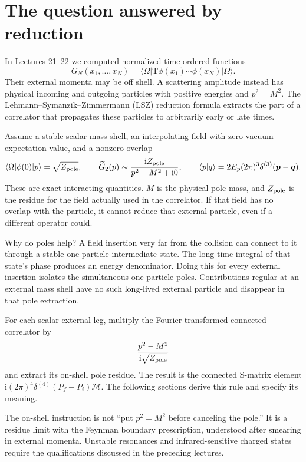 \documentclass[11pt]{article}
\newcommand{\ii}{\mathrm i}
\newcommand{\Tord}{\mathrm T}
\newcommand{\ket}[1]{\lvert#1\rangle}
\newcommand{\bra}[1]{\langle#1\rvert}
\newcommand{\cM}{\mathcal M}
\newcommand{\Zp}{Z_{\rm pole}}
\begin{document}
\section{The question answered by reduction}
In Lectures 21--22 we computed normalized time-ordered functions
\begin{equation}
 G_N(x_1,\ldots,x_N)
 =\bra{\Omega}\Tord\phi(x_1)\cdots\phi(x_N)\ket{\Omega}.
\end{equation}
Their external momenta may be off shell. A scattering amplitude instead
has physical incoming and outgoing particles with positive energies and
\(p^2=M^2\). The Lehmann--Symanzik--Zimmermann (LSZ) reduction formula
extracts the part of a correlator that propagates these particles to
arbitrarily early or late times.

Assume a stable scalar mass shell, an interpolating field with zero vacuum
expectation value, and a nonzero overlap
\begin{equation}
 \bra{\Omega}\phi(0)\ket{p}=\sqrt{\Zp},\qquad
 \widetilde G_2(p)\sim\frac{\ii\Zp}{p^2-M^2+\ii0},\qquad
 \langle p|q\rangle=2E_p(2\pi)^3\delta^{(3)}(\bm p-\bm q).
 \label{eq:pole}
\end{equation}
These are exact interacting quantities. \(M\) is the physical pole mass,
and \(\Zp\) is the residue for the field actually used in the correlator.
If that field has no overlap with the particle, it cannot reduce that
external particle, even if a different operator could.

Why do poles help? A field insertion very far from the collision can
connect to it through a stable one-particle intermediate state. The long
time integral of that state's phase produces an energy denominator.
Doing this for every external insertion isolates the simultaneous
one-particle poles. Contributions regular at an external mass shell have
no such long-lived external particle and disappear in that pole extraction.

\begin{keyidea}[The expected answer, with our factors of \(\ii\)]
For each scalar external leg, multiply the Fourier-transformed connected
correlator by
\[
 \frac{p^2-M^2}{\ii\sqrt{\Zp}}
\]
and extract its on-shell pole residue. The result is the connected
S-matrix element \(\ii(2\pi)^4\delta^{(4)}(P_f-P_i)\cM\).
The following sections derive this rule and specify its meaning.
\end{keyidea}
The on-shell instruction is not ``put \(p^2=M^2\) before canceling the
pole.'' It is a residue limit with the Feynman boundary prescription,
understood after smearing in external momenta. Unstable resonances and
infrared-sensitive charged states require the qualifications discussed
in the preceding lectures.
\end{document}
